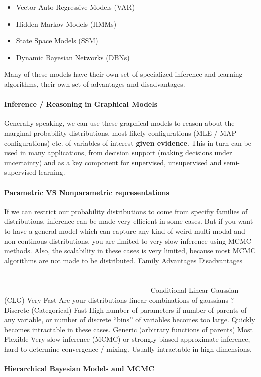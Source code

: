 \documentclass[letterpaper,10pt,english]{/home/londenberg/python-env/clean/lib/python2.7/site-packages/sphinx/texinputs/sphinxhowto}
\begin{document}
\begin{itemize}
\item
  Vector Auto-Regressive Models (VAR)
\item
  Hidden Markov Models (HMMs)
\item
  State Space Models (SSM)
\item
  Dynamic Bayesian Networks (DBNs)
\end{itemize}
Many of these models have their own set of specialized inference and
learning algorithms, their own set of advantages and disadvantages.\paragraph{Inference / Reasoning in Graphical Models}

Generally speaking, we can use these graphical models to reason about
the marginal probability distributions, most likely configurations (MLE
/ MAP configurations) etc. of variables of interest \textbf{given
evidence}. This in turn can be used in many applications, from decision
support (making decisions under uncertainty) and as a key component for
supervised, unsupervised and semi-supervised learning.\paragraph{Parametric VS Nonparametric representations}

If we can restrict our probability distributions to come from specifiy
families of distributions, inference can be made very efficient in some
cases. But if you want to have a general model which can capture any
kind of weird multi-modal and non-continous distributions, you are
limited to very slow inference using MCMC methods. Also, the scalability
in these cases is very limited, because most MCMC algorithms are not
made to be distributed.\textbar{} Family \textbar{} Advantages \textbar{} Disadvantages
\textbar{}
\textbar{}------------------------------------------\textbar{}----------------\textbar{}--------------------------------------------------------------------------------------------------------------------------------------------------------------------------\textbar{}
\textbar{} Conditional Linear Gaussian (CLG) \textbar{} Very Fast
\textbar{} Are your distributions linear combinations of gaussians ?
\textbar{} \textbar{} Discrete (Categorical) \textbar{} Fast \textbar{}
High number of parameters if number of parents of any variable, or
number of discrete ``bins'' of variables becomes too large. Quickly
becomes intractable in these cases. \textbar{} \textbar{} Generic
(arbitrary functions of parents) \textbar{} Most Flexible \textbar{}
Very slow inference (MCMC) or strongly biased approximate inference,
hard to determine convergence / mixing. Usually intractable in high
dimensions. \textbar{}\paragraph{Hierarchical Bayesian Models and MCMC}
\end{document}
